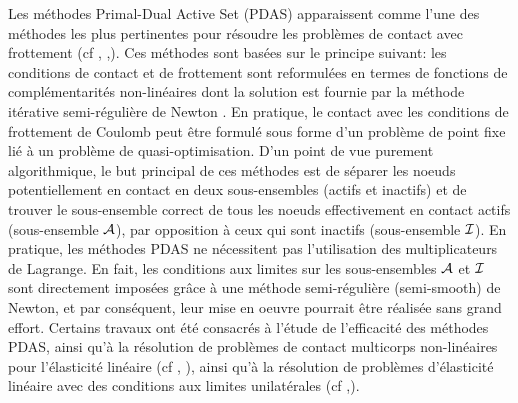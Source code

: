Les méthodes Primal-Dual Active Set (PDAS) apparaissent comme l'une des méthodes les plus pertinentes pour résoudre les problèmes de contact avec frottement (cf \cite{hintermuller2002primal}, \cite{hueber2008primal},\cite{hueber2005primal}). Ces méthodes sont basées sur le principe suivant: les conditions de contact et de frottement sont reformulées en termes de fonctions de complémentarités non-linéaires dont la solution est fournie par la méthode itérative semi-régulière de Newton \cite{hintermuller2002primal, hintermuller2003semismooth}. En pratique, le contact avec les conditions de frottement de Coulomb peut être formulé sous forme d'un problème de point fixe lié à un problème de quasi-optimisation. D'un point de vue purement algorithmique, le but principal de ces méthodes est de séparer les noeuds potentiellement en contact en deux sous-ensembles (actifs et inactifs) et de trouver le sous-ensemble correct de tous les noeuds effectivement en contact actifs (sous-ensemble $\cal A$), par opposition à ceux qui sont inactifs (sous-ensemble $\cal I$). En pratique, les méthodes PDAS ne nécessitent pas l'utilisation des multiplicateurs de Lagrange. En fait, les conditions aux limites sur les sous-ensembles $\cal A$ et $\cal I$ sont directement imposées grâce à une méthode semi-régulière (semi-smooth) de Newton, et par conséquent, leur mise en oeuvre pourrait être réalisée sans grand effort. Certains travaux ont été consacrés à l'étude de l'efficacité des méthodes PDAS, ainsi qu'à la résolution de problèmes de contact multicorps non-linéaires pour l'élasticité linéaire (cf \cite{hueber2008primal}, \cite{hueber2005primal}), ainsi qu'à la résolution de problèmes d'élasticité linéaire avec des conditions aux limites unilatérales (cf \cite{hintermuller2002primal},\cite{hintermuller2003semismooth}).\\ 

